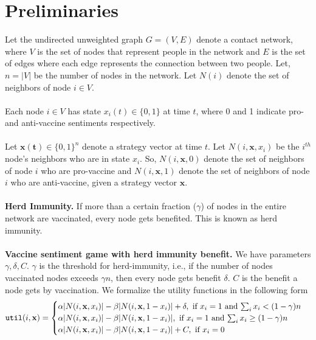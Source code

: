 \section{Preliminaries}

Let the undirected unweighted graph $G=(V, E)$ denote a contact network, where $V$ is the set of nodes that represent people in the network and $E$ is the set of edges where each edge represents the connection between two people. Let, $n=|V|$ be the number of nodes in the network. Let $N(i)$ denote the set of neighbors of node $i\in V$.
\\
\\
Each node $i\in V$ has state $x_i(t)\in\{0, 1\}$ at time $t$, where 0 and 1 indicate pro- and anti-vaccine sentiments respectively.
\\
\\
Let $\mathbf{x(t)}\in\{0, 1\}^n$ denote a strategy vector at time $t$. Let $N(i, \mathbf{x}, x_i)$ be the $i^{th}$ node's neighbors who are in state $x_i$. So,  $N(i, \mathbf{x}, 0)$  denote the set of neighbors of node $i$ who are pro-vaccine and $N(i, \mathbf{x}, 1)$  denote the set of neighbors of node $i$ who are anti-vaccine, given a strategy vector $\mathbf{x}$.
\\
\\
\noindent
\textbf{Herd Immunity.} If more than a certain fraction ($\gamma$) of nodes in the entire network are vaccinated, every node gets benefited. This is known as herd immunity.
\\
\\
\noindent
\textbf{Vaccine sentiment game with herd immunity benefit.}
We have parameters $\gamma, \delta, C$. $\gamma$ is the threshold for herd-immunity, i.e., if the number of nodes vaccinated nodes exceeds $\gamma n$, then every node gets benefit $\delta$. $C$ is the benefit a node gets by vaccination.
We formalize the utility functions in the following form
\[
\texttt{util}(i, \mathbf{x})=
\begin{cases}
\alpha|N(i, \mathbf{x}, x_i)| - \beta|N(i, \mathbf{x}, 1-x_i)| + \delta, \mbox{ if $x_i=1$ and $\sum_i x_i < (1-\gamma)n$}\\
\alpha|N(i, \mathbf{x}, x_i)| - \beta|N(i, \mathbf{x}, 1-x_i)|, \mbox{ if $x_i=1$ and $\sum_i x_i \geq (1-\gamma)n$}\\
\alpha|N(i, \mathbf{x}, x_i)| - \beta|N(i, \mathbf{x}, 1-x_i)| + C, \mbox{ if $x_i=0$}\\
\end{cases}
\]

